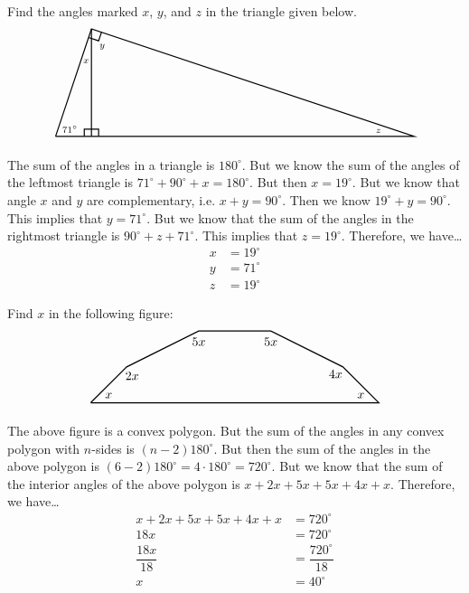 \documentclass[11pt,letterpaper]{article}
\begin{document}

 Find the angles marked $x$, $y$, and $z$ in the triangle given below. 
	\[
	\begin{tikzpicture}
	\draw[line width=0.03cm] (0,0) -- (1,3) -- (10,0) -- (0,0);
	\draw[line width=0.03cm] (1,3) -- (1,0);
	\draw[line width=0.03cm] (0.8,0) -- (0.8,0.2) -- (1.2,0.2) -- (1.2,0);
	\draw[line width=0.03cm] (0.92,2.76) -- (1.2,2.666) -- (1.2802,2.9066);
	\node at (0.4,0.2) {\scriptsize$71^\circ$};
	\node at (0.85,2.1) {\scriptsize$x$};
	\node at (1.3,2.5) {\scriptsize$y$};
	\node at (9,0.15) {\scriptsize$z$};
	\end{tikzpicture}
	\] \pspace

\sol The sum of the angles in a triangle is $180^\circ$. But we know the sum of the angles of the leftmost triangle is $71^\circ + 90^\circ + x= 180^\circ$. But then $x= 19^\circ$. But we know that angle $x$ and $y$ are complementary, i.e. $x + y= 90^\circ$. Then we know $19^\circ + y= 90^\circ$. This implies that $y= 71^\circ$. But we know that the sum of the angles in the rightmost triangle is $90^\circ + z + 71^\circ$. This implies that $z= 19^\circ$. Therefore, we have\dots
	\[
	\begin{aligned}
	x&= 19^\circ \\[0.3cm]
	y&= 71^\circ \\[0.3cm]
	z&= 19^\circ
	\end{aligned}
	\]



\newpage



 Find $x$ in the following figure:
	\[
	\begin{tikzpicture}
	\draw[line width=0.03cm] (0,0) -- (1,1) -- (3,2) -- (5,2) -- (7,1) -- (8,0) -- (0,0);
	\node at (0.5,0.2) {$x$};
	\node at (1.15,0.75) {$2x$};
	\node at (3,1.7) {$5x$};
	\node at (5,1.7) {$5x$};
	\node at (6.8,0.8) {$4x$};
	\node at (7.5,0.2) {$x$};
	\end{tikzpicture}
	\] \pspace

\sol The above figure is a convex polygon. But the sum of the angles in any convex polygon with $n$-sides is $(n - 2) 180^\circ$. But then the sum of the angles in the above polygon is $(6 - 2) 180^\circ= 4 \cdot 180^\circ= 720^\circ$. But we know that the sum of the interior angles of the above polygon is $x + 2x + 5x + 5x + 4x + x$. Therefore, we have\dots
	\[
	\begin{aligned}
	x + 2x + 5x + 5x + 4x + x&= 720^\circ \\[0.3cm]
	18x&= 720^\circ \\[0.3cm]
	\dfrac{18x}{18}&= \dfrac{720^\circ}{18} \\[0.3cm]
	x&= 40^\circ
	\end{aligned}
	\] 
\end{document}
